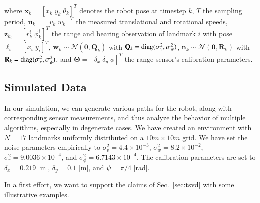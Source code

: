 \noindent where $\mathbf{x}_k=[x_k\;y_k\;\theta_k]^T$ denotes the robot pose at
timestep $k$, $T$ the sampling period, $\mathbf{u}_k=[v_k\;w_k]^T$ the measured
translational and rotational speeds, $\mathbf{z}_{k_i}=[r_k^i\;\phi_k^i]^T$ the
range and bearing observation of landmark $i$ with pose
$\boldsymbol{\ell}_i=[x_i\;y_i]^T$, $\mathbf{w}_k\sim\mathcal{N}(\mathbf{0},
\mathbf{Q}_k)$ with $\mathbf{Q}_k=\operatorname{diag}(\sigma^2_v,\sigma^2_w)$,
$\mathbf{n}_k\sim\mathcal{N}(\mathbf{0}, \mathbf{R}_k)$ with
$\mathbf{R}_k=\operatorname{diag}(\sigma^2_r,\sigma^2_\phi)$, and
$\mathbf{\Theta}=[\delta_x\;\delta_y\;\phi]^T$ the range sensor's calibration
parameters.

\subsection{Simulated Data}

In our simulation, we can generate various paths for the robot, along with
corresponding sensor measurements, and thus analyze the behavior of multiple
algorithms, especially in degenerate cases. We have created an environment
with $N=17$ landmarks uniformly distributed on a $10m\times 10m$ grid. We have
set the noise parameters empirically to $\sigma^2_v=4.4\times 10^{-3}$,
$\sigma^2_w=8.2\times 10^{-2}$, $\sigma^2_r=9.0036\times 10^{-4}$, and
$\sigma^2_\phi=6.7143\times 10^{-4}$. The calibration parameters are set to
$\delta_x=0.219$ [m], $\delta_y=0.1$ [m], and $\psi=\pi/4$ [rad].

In a first effort, we want to support the claims of Sec.~\ref{sec:tsvd} with some
illustrative examples.




